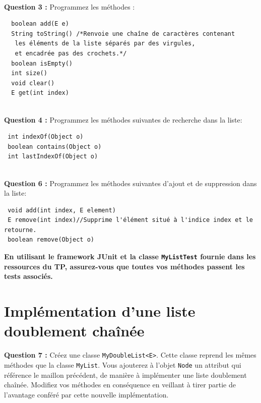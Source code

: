\documentclass[iutinfo,a4paper,nocorrections,10pt]{ustl-tdtp}
\begin{document}
~\\ \textbf{Question 3 :} Programmez les méthodes :
\begin{verbatim}
  boolean add(E e) 
  String toString() /*Renvoie une chaîne de caractères contenant
   les éléments de la liste séparés par des virgules,
   et encadrée pas des crochets.*/ 
  boolean isEmpty()
  int size()
  void clear()
  E get(int index)
\end{verbatim}

~\\ \textbf{Question 4 :} Programmez les méthodes suivantes de recherche dans la
liste:
\begin{verbatim}
 int indexOf(Object o) 
 boolean contains(Object o) 
 int lastIndexOf(Object o) 
\end{verbatim}


~\\ \textbf{Question 6 :} Programmez les méthodes suivantes d'ajout et de suppression dans la liste:
\begin{verbatim}
 void add(int index, E element) 
 E remove(int index)//Supprime l'élément situé à l'indice index et le retourne.
 boolean remove(Object o) 

\end{verbatim}
\textbf{En utilisant le framework JUnit et la classe \texttt{MyListTest} fournie dans les ressources du TP, assurez-vous que toutes vos méthodes passent les tests associés.}

\section{Implémentation d'une liste doublement chaînée}

\textbf{Question 7 :} Créez une classe \texttt{MyDoubleList<E>}. Cette classe reprend les mêmes méthodes que la classe \texttt{MyList}. Vous ajouterez à l'objet \texttt{Node} un attribut qui référence le maillon précédent, de manière à implémenter une liste doublement chaînée. Modifiez vos méthodes en conséquence en veillant à tirer partie de l'avantage conféré par cette nouvelle implémentation.
\end{document}
